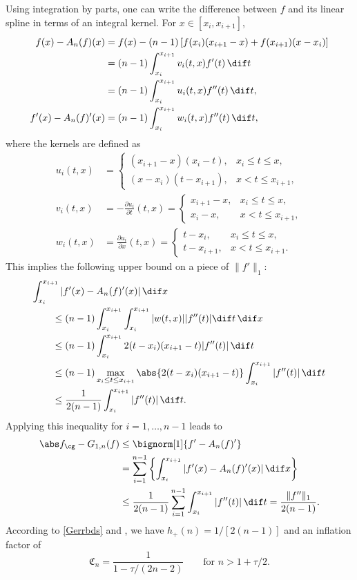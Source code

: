 Using integration by parts, one can write the difference between $f$ and its linear spline in terms of an integral kernel.  For $x \in [x_i,x_{i+1}]$, 
\begin{align}
\nonumber
f(x)-A_n (f)(x)
&= f(x) - (n-1) \left[f(x_{i})(x_{i+1}-x) +f(x_{i+1})(x-x_i) \right]\\
&= (n-1) \int_{x_i}^{x_{i+1}} v_i(t,x) f'(t) \, \dif t \label{fintermsfprime}\\
& = (n-1) \int_{x_i}^{x_{i+1}} u_i(t,x) f''(t) \, \dif t, \label{fintermsfdoubprime}\\
f'(x)-A_n(f)'(x) & = (n-1) \int_{x_i}^{x_{i+1}} w_i(t,x) f''(t) \, \dif t, \label{fprimeintermsfdoubprime}
\end{align}
where the kernels are defined as
\begin{align*}
u_i(t,x)& =\begin{cases} (x_{i+1}-x)(x_i-t), & x_i\leq t\leq x,\\
(x-x_{i})(t- x_{i+1}), & x< t \leq x_{i+1},
\end{cases} \\
v_i(t,x)& =- \frac{\partial u_i}{\partial t}(t,x) = \begin{cases}  x_{i+1}-x, & x_i\leq t\leq x,\\
x_{i}-x, & x< t \leq x_{i+1},
\end{cases} \\
w_i(t,x)& = \frac{\partial u_i}{\partial x}(t,x) = \begin{cases}  t-x_i, & x_i\leq t\leq x,\\
t-x_{i+1}, & x< t \leq x_{i+1}.
\end{cases}
\end{align*}
This implies the following upper bound on a piece of $\|f'\|_{1}$:
\begin{align*}
\MoveEqLeft{\int_{x_i}^{x_{i+1}}|f'(x)-A_n(f)'(x)| \, \dif x}\\
& \le (n-1) \int_{x_i}^{x_{i+1}} \int_{x_i}^{x_{i+1}}|w(t,x)||f''(t)| \dif t \, \dif x\\
& \le  (n-1)\int_{x_i}^{x_{i+1}}2(t-x_i)(x_{i+1}-t)|f''(t)| \, \dif t \\
& \le  (n-1) \max_{x_i \le t \le x_{i+1}} \abs{2(t-x_i)(x_{i+1}-t)} \int_{x_i}^{x_{i+1}} |f''(t)| \, \dif t \\
&  \le \frac{1}{2(n-1)}\int_{x_i}^{x_{i+1}} |f''(t)| \, \dif t .
\end{align*}
Applying this inequality for $i=1, \ldots, n-1$ leads to 
\begin{align*}
\Gnorm{f} - G_{1,n}(f) &  \le \bignorm[1]{f' -A_n(f)'} \\
& = \sum_{i=1}^{n-1} \left \{  \int_{x_i}^{x_{i+1}}|f'(x)-A_n(f)'(x)|\, \dif x \right \} \\
& \le \frac{1}{2(n-1)} \sum_{i=1}^{n-1} \int_{x_i}^{x_{i+1}} |f''(t)| \, \dif t = \frac{\|f''\|_{1}}{2(n-1)}.
\end{align*}
According to \eqref{Gerrbds} and , we have $h_{+}(n)=1/[2(n-1)]$ and an inflation factor of 
\begin{equation}\label{factor}
\mathfrak{C}_n =\frac{1}{1 - \tau/(2n-2)} \qquad \text{for } n>1+\tau/2.
\end{equation}

